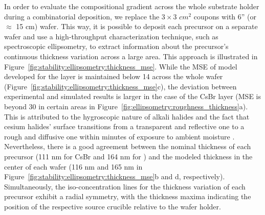 In order to evaluate the compositional gradient across the whole substrate holder during a combinatorial deposition, we replace the $3\times3$ $cm^2$ coupons with 6'' (or $\approx$ 15 cm) wafer. This way, it is possible to deposit each precursor on a separate wafer and use a high-throughput characterization technique, such as spectroscopic ellipsometry, to extract information about the precursor's continuous thickness variation across a large area. This approach is illustrated in Figure~\ref{fig:stability:ellipsometry:thickness_mse}. While the MSE of model developed for the  layer is maintained below 14 across the whole wafer (Figure~\ref{fig:stability:ellipsometry:thickness_mse}c), the deviation between experimental and simulated results is larger in the case of the CsBr layer (MSE is beyond 30 in certain areas in Figure~\ref{fig:ellipsometry:roughness_thickness}a). This is attributed to the hygroscopic nature of alkali halides and the fact that cesium halides' surface transitions from a transparent and reflective one to a rough and diffusive one within minutes of exposure to ambient moisture \cite{Chen2017All-Vacuum-Deposited11}. Nevertheless, there is a good agreement between the nominal thickness of each precursor (111 nm for CsBr and 164 nm for ) and the modeled thickness in the center of each wafer (116 nm and 165 nm in Figure~\ref{fig:stability:ellipsometry:thickness_mse}b and d, respectively). Simultaneously, the iso-concentration lines for the thickness variation of each precursor exhibit a radial symmetry, with the thickness maxima indicating the position of the respective source crucible relative to the wafer holder. 

